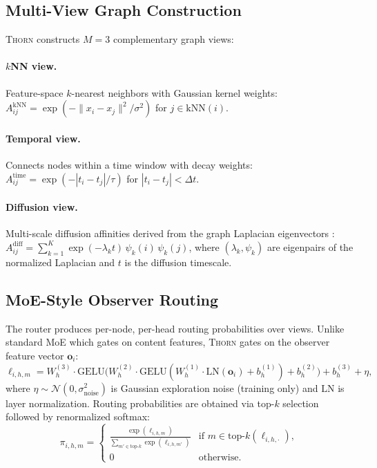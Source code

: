 \documentclass[11pt,a4paper]{article}
\newcommand{\thorn}{\textsc{Thorn}}
\begin{document}
\subsection{Multi-View Graph Construction}
\label{sec:views}

\thorn{} constructs $M = 3$ complementary graph views:

\paragraph{$k$NN view.}
Feature-space $k$-nearest neighbors with Gaussian kernel weights:
$A_{ij}^{\text{kNN}} = \exp(-\|x_i - x_j\|^2 / \sigma^2)$
for $j \in \text{kNN}(i)$.

\paragraph{Temporal view.}
Connects nodes within a time window with decay weights:
$A_{ij}^{\text{time}} = \exp(-|t_i - t_j| / \tau)$
for $|t_i - t_j| < \Delta t$.

\paragraph{Diffusion view.}
Multi-scale diffusion affinities derived from the graph Laplacian
eigenvectors \citep{coifman2006diffusion}:
$A_{ij}^{\text{diff}} = \sum_{k=1}^{K} \exp(-\lambda_k t)\,
\psi_k(i)\,\psi_k(j)$,
where $(\lambda_k, \psi_k)$ are eigenpairs of the normalized Laplacian
and $t$ is the diffusion timescale.

\subsection{MoE-Style Observer Routing}
\label{sec:routing}

The router produces per-node, per-head routing probabilities over views.
Unlike standard MoE which gates on content features, \thorn{} gates on
the observer feature vector $\mathbf{o}_i$:
\begin{equation}
  \label{eq:routing}
  \ell_{i,h,m} = W_h^{(3)} \cdot \mathrm{GELU}\!\big(
    W_h^{(2)} \cdot \mathrm{GELU}(
    W_h^{(1)} \cdot \mathrm{LN}(\mathbf{o}_i) + b_h^{(1)}
  ) + b_h^{(2)}\big) + b_h^{(3)} + \eta,
\end{equation}
where $\eta \sim \mathcal{N}(0, \sigma_{\text{noise}}^2)$ is Gaussian
exploration noise (training only) and $\mathrm{LN}$ is layer
normalization.
Routing probabilities are obtained via top-$k$ selection followed by
renormalized softmax:
\begin{equation}
  \label{eq:topk}
  \pi_{i,h,m} =
  \begin{cases}
    \frac{\exp(\ell_{i,h,m})}{\sum_{m' \in \text{top-}k}
      \exp(\ell_{i,h,m'})} & \text{if } m \in \text{top-}k(\ell_{i,h,\cdot}), \\
    0 & \text{otherwise}.
  \end{cases}
\end{equation}
\end{document}
